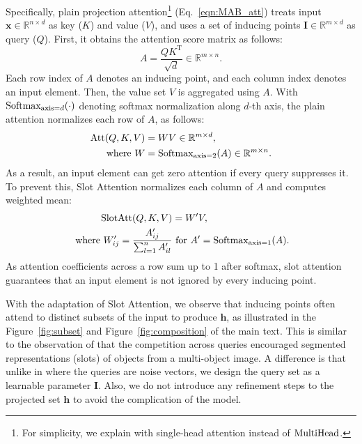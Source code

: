 \documentclass[final]{arxiv/cvpr}
\begin{document}
Specifically, plain projection attention\footnote{For simplicity, we explain with single-head attention instead of $\textnormal{MultiHead}$.} (Eq.~\eqref{eqn:MAB_att}) treats input $\mathbf{x}\in\mathbb{R}^{n\times d}$ as key ($K$) and value ($V$), and uses a set of inducing points $\mathbf{I}\in\mathbb{R}^{m\times d}$ as query ($Q$).
First, it obtains the attention score matrix as follows:
\begin{equation}
    A = \frac{QK^\mathrm{T}}{\sqrt{d}} \in\mathbb{R}^{m\times n}.
\end{equation}
Each row index of $A$ denotes an inducing point, and each column index denotes an input element.
Then, the value set $V$ is aggregated using $A$.
With $\textnormal{Softmax}_{\textnormal{axis}=d}(\cdot)$ denoting softmax normalization along $d$-th axis, the plain attention normalizes each row of $A$, as follows:
\begin{align}
    \textnormal{Att}(Q, K, V) &= WV\in\mathbb{R}^{m\times d}, \\
    \textnormal{ where } W &= \textnormal{Softmax}_{\textnormal{axis}=2}(A)\in\mathbb{R}^{m\times n}.
\end{align}
As a result, an input element can get zero attention if every query suppresses it.
To prevent this, Slot Attention normalizes each column of $A$ and computes weighted mean:
\begin{align}
    \textnormal{SlotAtt}(Q, K, V) &= W'V, \\
    \textnormal{ where } W'_{ij} = \frac{A'_{ij}}{\sum_{l=1}^n{A'_{il}}}&
    \textnormal{ for } A' = \textnormal{Softmax}_{\textnormal{axis}=1}(A).
\end{align}
As attention coefficients across a row sum up to 1 after softmax, slot attention guarantees that an input element is not ignored by every inducing point.

With the adaptation of Slot Attention, we observe that inducing points often attend to distinct subsets of the input to produce $\mathbf{h}$, as illustrated in the Figure~\ref{fig:subset} and Figure~\ref{fig:composition} of the main text.
This is similar to the observation of \cite{locatello2020objectcentric} that the competition across queries encouraged segmented representations (slots) of objects from a multi-object image.
A difference is that unlike in \cite{locatello2020objectcentric} where the queries are noise vectors, we design the query set as a learnable parameter $\mathbf{I}$.
Also, we do not introduce any refinement steps to the projected set $\mathbf{h}$ to avoid the complication of the model.
\end{document}
